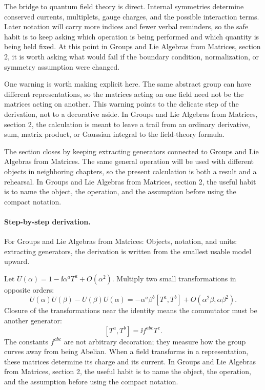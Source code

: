 The bridge to quantum field theory is direct.  Internal symmetries determine conserved currents, multiplets, gauge charges, and the possible interaction terms.  Later notation will carry more indices and fewer verbal reminders, so the safe habit is to keep asking which operation is being performed and which quantity is being held fixed.  At this point in Groups and Lie Algebras from Matrices, section 2, it is worth asking what would fail if the boundary condition, normalization, or symmetry assumption were changed.

One warning is worth making explicit here.  The same abstract group can have different representations, so the matrices acting on one field need not be the matrices acting on another.  This warning points to the delicate step of the derivation, not to a decorative aside.  In Groups and Lie Algebras from Matrices, section 2, the calculation is meant to leave a trail from an ordinary derivative, sum, matrix product, or Gaussian integral to the field-theory formula.

The section closes by keeping extracting generators connected to Groups and Lie Algebras from Matrices.  The same general operation will be used with different objects in neighboring chapters, so the present calculation is both a result and a rehearsal.  In Groups and Lie Algebras from Matrices, section 2, the useful habit is to name the object, the operation, and the assumption before using the compact notation.



\paragraph{Step-by-step derivation.}

For Groups and Lie Algebras from Matrices: Objects, notation, and units: extracting generators, the derivation is written from the smallest usable model upward.

Let \(U(\alpha)=1-\ii\alpha^aT^a+O(\alpha^2)\).  Multiply two small transformations in opposite orders:
\[
  U(\alpha)U(\beta)-U(\beta)U(\alpha)
  =
  -\alpha^a\beta^b[T^a,T^b]+O(\alpha^2\beta,\alpha\beta^2).
\]
Closure of the transformations near the identity means the commutator must be another generator:
\[
  [T^a,T^b]=\ii f^{abc}T^c.
\]
The constants \(f^{abc}\) are not arbitrary decoration; they measure how the group curves away from being Abelian.  When a field transforms in a representation, these matrices determine its charge and its current.  In Groups and Lie Algebras from Matrices, section 2, the useful habit is to name the object, the operation, and the assumption before using the compact notation.

